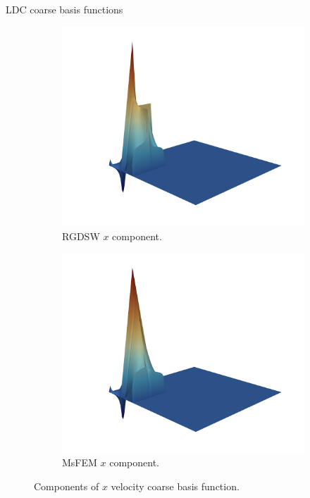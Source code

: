 \begin{frame}[noframenumbering]{LDC coarse basis functions}
	\begin{figure}
		\centering
		\begin{subfigure}{0.5\textwidth}
			\includegraphics[width=\textwidth]{images/RGDSW-x}
			\caption{RGDSW $x$ component.}
		\end{subfigure}%
		\begin{subfigure}{0.5\textwidth}
			\includegraphics[width=\textwidth]{images/MsFEM-x}
			\caption{MsFEM $x$ component.}
		\end{subfigure}
		\caption{Components of $x$ velocity coarse basis function.}
	\end{figure}
\end{frame}

